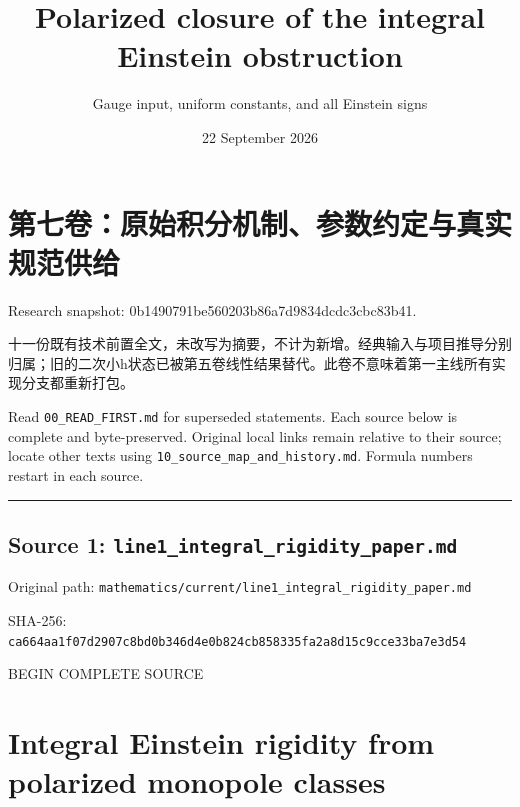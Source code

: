 \documentclass[
  10pt,
]{article}
\title{Polarized closure of the integral Einstein obstruction}
\subtitle{Gauge input, uniform constants, and all Einstein signs}
\author{}
\date{22 September 2026}
\begin{document}
\maketitle

\hypertarget{ux7b2cux4e03ux5377ux539fux59cbux79efux5206ux673aux5236ux53c2ux6570ux7ea6ux5b9aux4e0eux771fux5b9eux89c4ux8303ux4f9bux7ed9}{%
\section{第七卷：原始积分机制、参数约定与真实规范供给}\label{ux7b2cux4e03ux5377ux539fux59cbux79efux5206ux673aux5236ux53c2ux6570ux7ea6ux5b9aux4e0eux771fux5b9eux89c4ux8303ux4f9bux7ed9}}

Research snapshot: 0b1490791be560203b86a7d9834dcdc3cbc83b41.

十一份既有技术前置全文，未改写为摘要，不计为新增。经典输入与项目推导分别归属；旧的二次小h状态已被第五卷线性结果替代。此卷不意味着第一主线所有实现分支都重新打包。

Read \nolinkurl{00_READ_FIRST.md} for superseded statements. Each source below is
complete and byte-preserved. Original local links remain relative to
their source; locate other texts using \nolinkurl{10_source_map_and_history.md}.
Formula numbers restart in each source.

\begin{center}\rule{0.5\linewidth}{0.5pt}\end{center}

\hypertarget{source-1-line1_integral_rigidity_paper.md}{%
\subsection{Source 1:
\nolinkurl{line1_integral_rigidity_paper.md}}\label{source-1-line1_integral_rigidity_paper.md}}

Original path:
\nolinkurl{mathematics/current/line1_integral_rigidity_paper.md}

SHA-256:
\nolinkurl{ca664aa1f07d2907c8bd0b346d4e0b824cb858335fa2a8d15c9cce33ba7e3d54}

BEGIN COMPLETE SOURCE

\hypertarget{integral-einstein-rigidity-from-polarized-monopole-classes}{%
\section{Integral Einstein rigidity from polarized monopole
classes}\label{integral-einstein-rigidity-from-polarized-monopole-classes}}
\end{document}
